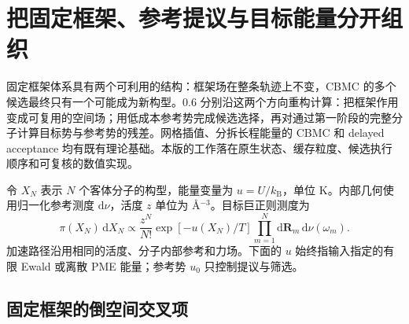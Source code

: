 
\section{把固定框架、参考提议与目标能量分开组织}
\label{sec:06-decomposition}

固定框架体系具有两个可利用的结构：框架场在整条轨迹上不变，CBMC 的多个候选最终只有一个可能成为新构型。0.6 分别沿这两个方向重构计算：把框架作用变成可复用的空间场；用低成本参考势完成候选选择，再对通过第一阶段的完整分子计算目标势与参考势的残差。网格插值、分拆长程能量的 CBMC 和 delayed acceptance 均有既有理论基础\cite{dubbeldam2013,ran2025,christen2005}。本版的工作落在原生状态、缓存粒度、候选执行顺序和可复核的数值实现。

令 $X_N$ 表示 $N$ 个客体分子的构型，能量变量为 $u=U/k_{\mathrm B}$，单位 K。内部几何使用归一化参考测度 $\mathrm d\nu$，活度 $z$ 单位为 \AA$^{-3}$。目标巨正则测度为
\begin{equation}
\pi(X_N)\,\mathrm dX_N
\propto \frac{z^N}{N!}\exp[-u(X_N)/T]
\prod_{m=1}^N\mathrm d\mathbf R_m\,\mathrm d\nu(\omega_m).
\label{eq:06-target}
\end{equation}
加速路径沿用相同的活度、分子内部参考和力场。下面的 $u$ 始终指输入指定的有限 Ewald 或离散 PME 能量；参考势 $u_0$ 只控制提议与筛选。

\subsection{固定框架的倒空间交叉项}

